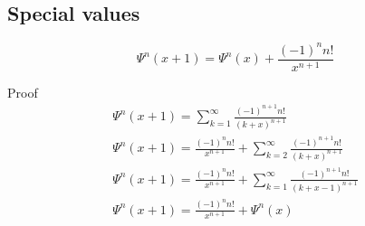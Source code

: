 \documentclass[a4paper]{article}
\begin{document}
    \subsection{Special values}\label{subsec:special-values}
    \begin{theorem}
        \begin{equation}
            \Psi^{n}(x+1) = \Psi^{n}(x) + \frac{(-1)^n n!}{x^{n+1}} \label{eq:equation12}
        \end{equation}

        Proof
        \\
        \begin{gather*}
            \Psi^{n}(x + 1) = \sum_{k=1}^{\infty} \frac{(-1)^{n+1} n! }{(k+x)^{n+1}}
            \\
            \Psi^{n}(x + 1) = \frac{(-1)^n n!}{x^{n+1}}  + \sum_{k=2}^{\infty} \frac{(-1)^{n+1} n! }{(k+x)^{n+1}}
            \\
            \Psi^{n}(x + 1) = \frac{(-1)^n n!}{x^{n+1}}  + \sum_{k=1}^{\infty} \frac{(-1)^{n+1} n! }{(k+x - 1)^{n+1}}
            \\
            \Psi^{n}(x + 1) = \frac{(-1)^n n!}{x^{n+1}}  + \Psi^{n}(x)
        \end{gather*}
    \end{theorem}
\end{document}
